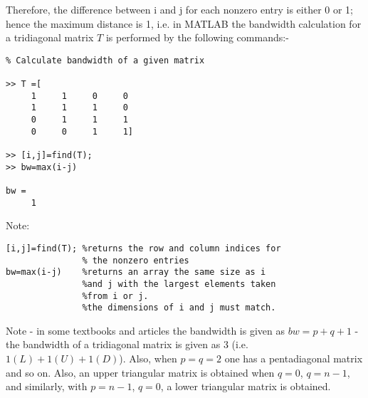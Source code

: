 \noindent
\vskip 5pt
\noindent
Therefore, the difference between i and j for each nonzero entry is either 0 or
1; hence the maximum distance is 1, i.e. in MATLAB the bandwidth calculation for
a tridiagonal matrix $T$ is performed by the following commands:-
\vskip 2pt
\noindent
\begin{lstlisting}
% Calculate bandwidth of a given matrix

>> T =[
     1     1     0     0
     1     1     1     0
     0     1     1     1
     0     0     1     1]

>> [i,j]=find(T);
>> bw=max(i-j)

bw =
     1
\end{lstlisting}
\vskip 12pt
\noindent
Note:
\vskip 4pt
\noindent

\begin{lstlisting}
[i,j]=find(T); %returns the row and column indices for
               % the nonzero entries
bw=max(i-j)    %returns an array the same size as i
               %and j with the largest elements taken
               %from i or j.
               %the dimensions of i and j must match.
\end{lstlisting}
\vskip 2pt
\noindent
Note - in some textbooks and articles the bandwidth is given as $bw=p+q+1$ - the
bandwidth of a tridiagonal matrix is given as 3 (i.e. $1(L) + 1(U) + 1(D)$). 
Also, when $p=q=2$ one has a pentadiagonal matrix and so on. Also, an upper
triangular matrix is obtained when $q=0$, $q=n-1$, and similarly, with $p=n-1$,
$q=0$, a lower triangular matrix is obtained.
\newpage
